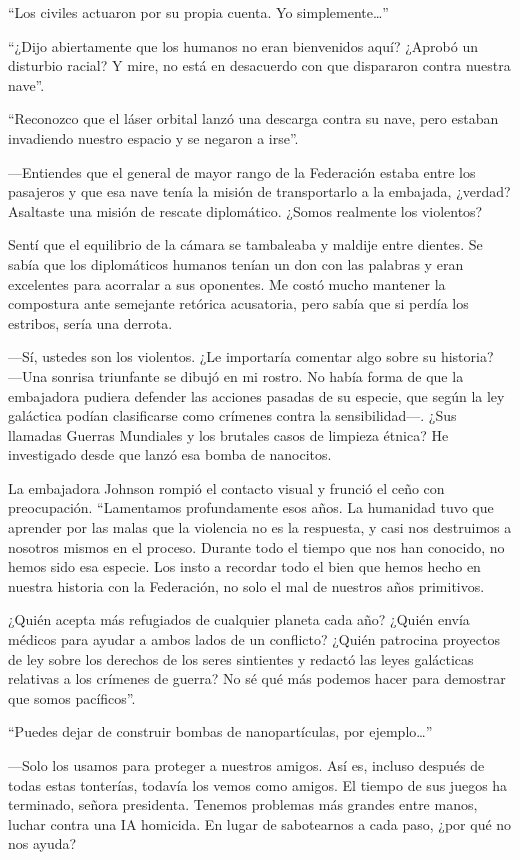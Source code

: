 ``Los civiles actuaron por su propia cuenta. Yo simplemente…''


``¿Dijo abiertamente que los humanos no eran bienvenidos aquí? ¿Aprobó un disturbio racial? Y mire, no está en desacuerdo con que dispararon contra nuestra nave''.

``Reconozco que el láser orbital lanzó una descarga contra su nave, pero estaban invadiendo nuestro espacio y se negaron a irse''.

—Entiendes que el general de mayor rango de la Federación estaba entre los pasajeros y que esa nave tenía la misión de transportarlo a la embajada, ¿verdad? Asaltaste una misión de rescate diplomático. ¿Somos realmente los violentos?

Sentí que el equilibrio de la cámara se tambaleaba y maldije entre dientes. Se sabía que los diplomáticos humanos tenían un don con las palabras y eran excelentes para acorralar a sus oponentes. Me costó mucho mantener la compostura ante semejante retórica acusatoria, pero sabía que si perdía los estribos, sería una derrota.

—Sí, ustedes son los violentos. ¿Le importaría comentar algo sobre su historia? —Una sonrisa triunfante se dibujó en mi rostro. No había forma de que la embajadora pudiera defender las acciones pasadas de su especie, que según la ley galáctica podían clasificarse como crímenes contra la sensibilidad—. ¿Sus llamadas Guerras Mundiales y los brutales casos de limpieza étnica? He investigado desde que lanzó esa bomba de nanocitos.

La embajadora Johnson rompió el contacto visual y frunció el ceño con preocupación. ``Lamentamos profundamente esos años. La humanidad tuvo que aprender por las malas que la violencia no es la respuesta, y casi nos destruimos a nosotros mismos en el proceso. Durante todo el tiempo que nos han conocido, no hemos sido esa especie. Los insto a recordar todo el bien que hemos hecho en nuestra historia con la Federación, no solo el mal de nuestros años primitivos.

¿Quién acepta más refugiados de cualquier planeta cada año? ¿Quién envía médicos para ayudar a ambos lados de un conflicto? ¿Quién patrocina proyectos de ley sobre los derechos de los seres sintientes y redactó las leyes galácticas relativas a los crímenes de guerra? No sé qué más podemos hacer para demostrar que somos pacíficos''.

``Puedes dejar de construir bombas de nanopartículas, por ejemplo…''


—Solo los usamos para proteger a nuestros amigos. Así es, incluso después de todas estas tonterías, todavía los vemos como amigos. El tiempo de sus juegos ha terminado, señora presidenta. Tenemos problemas más grandes entre manos, luchar contra una IA homicida. En lugar de sabotearnos a cada paso, ¿por qué no nos ayuda?

